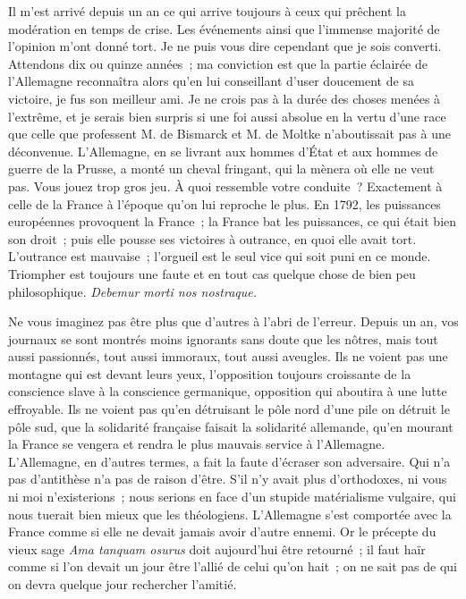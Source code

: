 \documentclass[french,twoside]{book} %
\begin{document}
Il m’est arrivé depuis un an ce qui arrive toujours à ceux qui prêchent la modération en temps de crise. Les événements ainsi que l’immense majorité de l’opinion m’ont donné tort. Je ne puis vous dire cependant que je sois converti. Attendons dix ou quinze années ; ma conviction est que la partie éclairée de l’Allemagne reconnaîtra alors qu’en lui conseillant d’user doucement de sa victoire, je fus son meilleur ami. Je ne crois pas à la durée des choses menées à l’extrême, et je serais bien surpris si une foi aussi absolue en la vertu d’une race que celle que professent M. de Bismarck et M. de Moltke n’aboutissait pas à une déconvenue. L’Allemagne, en se livrant aux hommes d’État et aux hommes de guerre de la Prusse, a monté un cheval fringant, qui la mènera où elle ne veut pas. Vous jouez trop gros jeu. À quoi ressemble votre conduite ? Exactement à celle de la France à l’époque qu’on lui reproche le plus. En 1792, les puissances européennes provoquent la France ; la France bat les puissances, ce qui était bien son droit ; puis elle pousse ses victoires à outrance, en quoi elle avait tort. L’outrance est mauvaise ; l’orgueil est le seul vice qui soit puni en ce monde. Triompher est toujours une faute et en tout cas quelque chose de bien peu philosophique. {\itshape Debemur morti nos nostraque.}\par
Ne vous imaginez pas être plus que d’autres à l’abri de l’erreur. Depuis un an, vos journaux se sont montrés moins ignorants sans doute que les nôtres, mais tout aussi passionnés, tout aussi immoraux, tout aussi aveugles. Ils ne voient pas une montagne qui est devant leurs yeux, l’opposition toujours croissante de la conscience slave à la conscience germanique, opposition qui aboutira à une lutte effroyable. Ils ne voient pas qu’en détruisant le pôle nord d’une pile on détruit le pôle sud, que la solidarité française faisait la solidarité allemande, qu’en mourant la France se vengera et rendra le plus mauvais service à l’Allemagne. L’Allemagne, en d’autres termes, a fait la faute d’écraser son adversaire. Qui n’a pas d’antithèse n’a pas de raison d’être. S’il n’y avait plus d’orthodoxes, ni vous ni moi n’existerions ; nous serions en face d’un stupide matérialisme vulgaire, qui nous tuerait bien mieux que les théologiens. L’Allemagne s’est comportée avec la France comme si elle ne devait jamais avoir d’autre ennemi. Or le précepte du vieux sage {\itshape Ama tanquam osurus} doit aujourd’hui être retourné ; il faut haïr comme si l’on devait un jour être l’allié de celui qu’on hait ; on ne sait pas de qui on devra quelque jour rechercher l’amitié.\par
\end{document}
